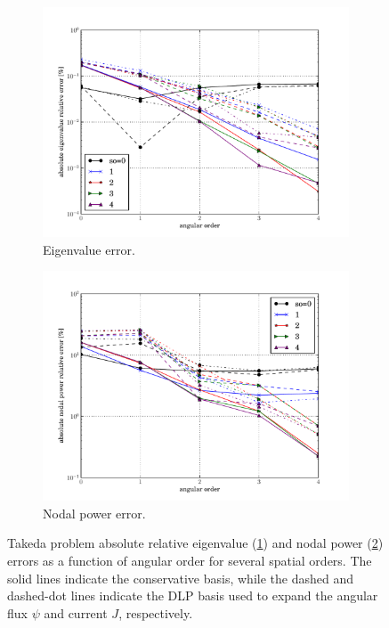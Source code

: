 \begin{figure}[htbp]
  \centering
  \begin{subfigure}{0.49\textwidth}
    \centering
    \includegraphics[keepaspectratio, width=1.0\textwidth]
                    {takeda_order_study_eigenvalue_error}
    \caption{Eigenvalue error.}
    \label{fig:takeda_order_study_eigenvalue_error}                   
  \end{subfigure}
  \begin{subfigure}{0.49\textwidth}
    \centering
    \includegraphics[keepaspectratio, width=1.0\textwidth]
                    {takeda_order_study_nodal_power_error}
    \caption{Nodal power error.}
    \label{fig:takeda_order_study_nodal_power_error}                 
  \end{subfigure}
  \caption{Takeda problem absolute relative 
           eigenvalue (\ref{fig:takeda_order_study_eigenvalue_error})
           and nodal power (\ref{fig:takeda_order_study_nodal_power_error})
           errors as 
           a function of angular order for several spatial orders.  
           The solid lines indicate the conservative basis, while the 
           dashed and dashed-dot lines indicate the DLP basis used to 
           expand the angular flux $\psi$ and current $J$, respectively.}  
  \label{fig:core_benchmark_plot}
\end{figure}

